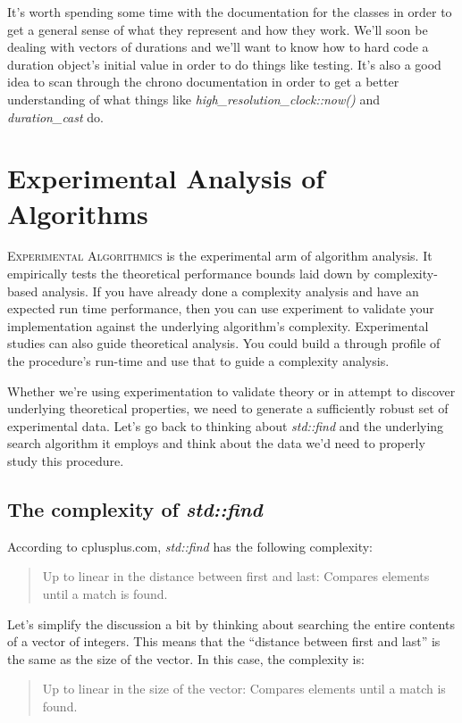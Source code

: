 \documentclass[]{tufte-handout}
\begin{document}
It's worth spending some time with the documentation for the classes in order to get a general sense of what they represent and how they work. We'll soon be dealing with vectors of durations and we'll want to know how to hard code a duration object's initial value in order to do things like testing. It's also a good idea to scan through the chrono documentation in order to get a better understanding of what things like \textit{high\_resolution\_clock::now()} and \textit{duration\_cast} do.

\section{Experimental Analysis of Algorithms}

\textsc{Experimental Algorithmics} is the experimental arm of algorithm analysis.  It empirically tests the theoretical performance bounds laid down by complexity-based analysis. If you have already done a complexity analysis and have an expected run time performance, then you can use experiment to validate your implementation against the underlying algorithm's complexity.  Experimental studies can also guide theoretical analysis. You could build a through profile of the procedure's run-time and use that to guide a complexity analysis.

Whether we're using experimentation to validate theory or in attempt to discover underlying theoretical properties, we need to generate a sufficiently robust set of experimental data. Let's go back to thinking about \textit{std::find} and the underlying search algorithm it employs and think about the data we'd need to properly study this procedure.

\subsection{The complexity of \textit{std::find}}

According to cplusplus.com, \textit{std::find} has the following complexity:
\begin{quote}
Up to linear in the distance between first and last: Compares elements until a match is found.
\end{quote}
Let's simplify the discussion a bit by thinking about searching the entire contents of a vector of integers. This means that the ``distance between first and last'' is the same as the size of the vector. In this case, the complexity is:
\begin{quote}
Up to linear in the size of the vector: Compares elements until a match is found.
\end{quote}
\end{document}
